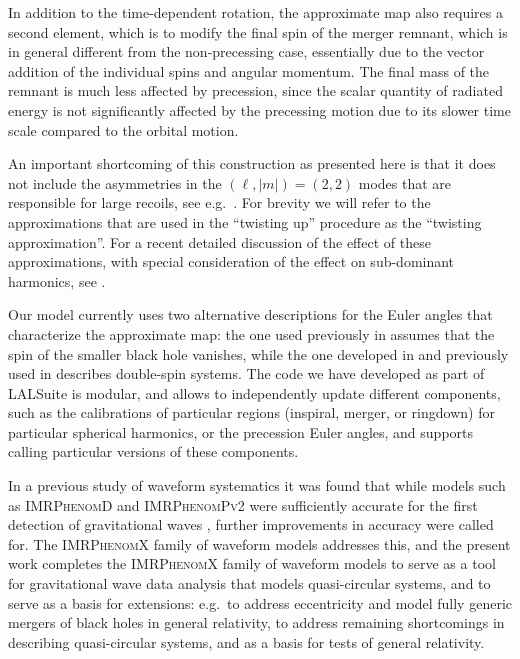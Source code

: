 \documentclass[%
aps,
prd,
amssymb,
amsmath,
amsfonts,
eqsecnum,
showpacs,
nofootinbib,
floatfix,
twocolumn,
twoside,
a4paper,
superscriptaddress
]{revtex4-1}
\newcommand{\ppvtwo}{\textsc{IMRPhenomPv2}\xspace}
\newcommand{\phD}{\textsc{IMRPhenomD}\xspace}
\newcommand{\phXF}{\textsc{IMRPhenomX}\xspace}
\begin{document}
In addition to the time-dependent rotation, the approximate map also requires a second element, which is to modify the final spin of the merger remnant, which is in general different from the non-precessing case, essentially due to the vector addition of the individual spins and angular momentum.
The final mass of the remnant is much less affected by precession, since the scalar quantity of radiated energy is not significantly affected by the precessing motion due to its slower time scale compared to the orbital motion.

An important shortcoming of this construction as presented here is that it does not include the asymmetries in the $(\ell, \vert m\vert) = (2,2)$ modes that are responsible for large recoils, see e.g.~\cite{Brugmann:2007zj}. For brevity we will refer to the approximations that are used in the ``twisting up'' procedure as the ``twisting approximation''.
For a recent detailed discussion of the effect of these approximations, with special consideration of the effect on sub-dominant harmonics, see \cite{Ramos-Buades:2020noq,Thomas:2020uqj}.
 
Our model currently uses two alternative descriptions for the Euler angles that characterize the approximate map: the one used previously in \cite{Hannam:2013oca,Bohe:PPv2} assumes that the spin of the smaller black hole vanishes, while the one developed in \cite{Chatziioannou:2017tdw} and previously used in \cite{Khan:2018fmp,Khan:2019kot} describes double-spin systems.
The code we have developed as part of LALSuite \cite{lalsuite} is modular, and allows to independently update different components, such as the calibrations of particular regions (inspiral, merger, or ringdown) for particular spherical harmonics, or the precession Euler angles, and supports calling particular versions of these components.


In a previous study of waveform systematics \cite{Abbott:2016wiq} it was found that while models such as \phD and \ppvtwo were sufficiently accurate for the first detection of gravitational waves \cite{Abbott:2016blz}, further improvements in accuracy were called for.
The \phXF family of waveform models addresses this, and the present work completes the \phXF family of waveform models to serve as a tool for gravitational wave data analysis that models quasi-circular systems, and to serve as a basis for extensions: e.g.~to address eccentricity and model fully generic mergers of black holes in general relativity, to address remaining shortcomings in describing quasi-circular systems, and as a basis for tests of general relativity.
\end{document}
